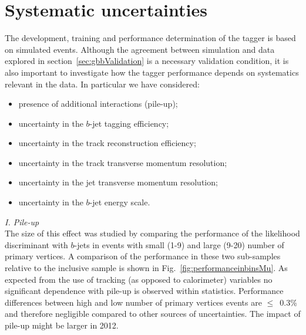 \section{Systematic uncertainties}\label{sec:gbbSystematics}
The development, training and performance determination of the tagger is based on simulated events. Although the agreement between simulation and data explored in section~\ref{sec:gbbValidation} is a necessary validation condition, it is also important to investigate how the tagger performance depends on systematics relevant in the data. In particular we have considered:
%
%
\begin{itemize}\addtolength{\itemsep}{-0.4\baselineskip}
\item
presence of additional interactions (pile-up);
\item
uncertainty in the $b$-jet tagging efficiency; %
\item
uncertainty in the track reconstruction efficiency;
\item
uncertainty in the track transverse momentum resolution;
\item
uncertainty in the jet transverse momentum resolution;
\item
uncertainty in the $b$-jet energy scale.
\end{itemize}

{ \em I. Pile-up}
\\[3mm]
  The size of this effect was studied by comparing the performance of the likelihood discriminant with $b$-jets in events with small (1-9) and large (9-20) number of primary vertices. 
A comparison of the performance in these two sub-samples relative to the inclusive sample is shown in Fig.~\ref{fig:performanceinbinsMu}. 
As expected from the use of tracking (as opposed to calorimeter) variables no significant dependence with pile-up is observed within statistics. %
Performance differences between high and low number of primary vertices events are $\leq$~0.3\% and therefore negligible compared to other sources of uncertainties. The impact of pile-up might be larger in 2012.

